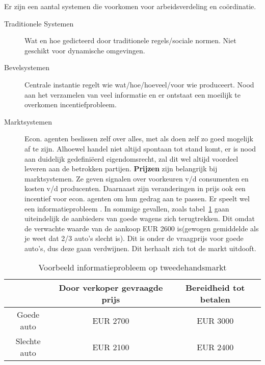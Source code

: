 Er zijn een aantal systemen die voorkomen voor arbeidsverdeling en co\"{o}rdinatie.
\begin{description}
	\item[Traditionele Systemen] Wat en hoe gedicteerd door traditionele regels/sociale normen. Niet geschikt voor dynamische omgevingen.
    \item[Bevelsystemen] Centrale instantie regelt wie wat/hoe/hoeveel/voor wie produceert. Nood aan het verzamelen van veel informatie en er ontstaat een moeilijk te overkomen incentiefprobleem.
    \item[Marktsystemen] Econ. agenten beslissen zelf over alles, met als doen zelf zo goed mogelijk af te zijn. Alhoewel handel niet  altijd spontaan tot stand komt, er is nood aan duidelijk gedefini\"{e}erd eigendomsrecht, zal dit wel altijd voordeel leveren aan de betrokken partijen. \textbf{Prijzen} zijn belangrijk bij marktsystemen. Ze geven signalen over voorkeuren v/d consumenten en kosten v/d producenten. Daarnaast zijn veranderingen in prijs ook een incentief voor econ. agenten om hun gedrag aan te passen. Er speelt wel een informatieprobleem . In sommige gevallen, zoals tabel~\ref{tab:tweedeHands} gaan uiteindelijk de aanbieders van goede wagens zich terugtrekken. Dit omdat de verwachte waarde van de aankoop EUR 2600 is(gewogen gemiddelde als je weet dat 2/3 auto's slecht is). Dit is onder de vraagprijs voor goede auto's, dus deze gaan verdwijnen. Dit herhaalt zich tot de markt uitdooft.
\end{description}
\begin{table}[h]
	\centering
    \begin{tabular}{ | c |  c |  c | }
		\hline
		& Door verkoper gevraagde prijs  &  Bereidheid tot betalen \\
		\hline
		 Goede auto & EUR 2700 & EUR 3000 \\
		\hline
		Slechte auto & EUR 2100 & EUR 2400\\
		\hline
	\end{tabular}
	\caption{Voorbeeld informatieprobleem op tweedehandsmarkt}
    \label{tab:tweedeHands}
\end{table}


